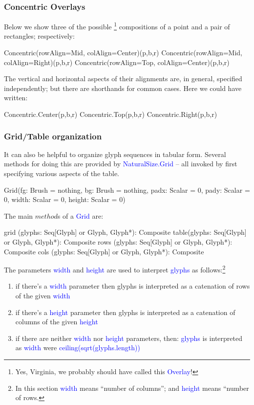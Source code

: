 \documentclass[12pt,a4paper]{article}
\def\Scala#1{\textcolor{blue}{\textsf{#1}}}
\def\SSS#1{\subsubsection*{#1}}
\begin{document}
\SSS{Concentric Overlays}
Below we show three of the possible \footnote{Yes,
Virginia, we probably should have called this \Scala{Overlay}!} 
compositions of a point and a pair of rectangles; respectively:
\begin{scala}
        Concentric(rowAlign=Mid, colAlign=Center)(p,b,r)
        Concentric(rowAlign=Mid, colAlign=Right)(p,b,r)
        Concentric(rowAlign=Top, colAlign=Center)(p,b,r)      
\end{scala}

\begin{center}
\quad\quad
{}
\quad\quad
{} 
\end{center}


The vertical and horizontal aspects of their alignments are, in general,
specified independently; but there are shorthands for common cases. Here
we could have written:

\begin{scala}
        Concentric.Center(p,b,r)
        Concentric.Top(p,b,r)
        Concentric.Right(p,b,r)      
\end{scala}

\clearpage
\SSS{Grid/Table organization}

It can also be helpful to organize glyph sequences in tabular form.
Several methods for doing this are provided by \Scala{NaturalSize.Grid}
-- all invoked by first specifying various aspects of the table.
\begin{scala}
        Grid(fg:     Brush  = nothing,
             bg:     Brush  = nothing,
             padx:   Scalar = 0,
             pady:   Scalar = 0,
             width:  Scalar = 0,
             height: Scalar = 0)
\end{scala}

The main $method$s of a \Scala{Grid} are:
\begin{scala}
  grid (glyphs: Seq[Glyph] or Glyph, Glyph*): Composite
  table(glyphs: Seq[Glyph] or Glyph, Glyph*): Composite
  rows (glyphs: Seq[Glyph] or Glyph, Glyph*): Composite
  cols (glyphs: Seq[Glyph] or Glyph, Glyph*): Composite
\end{scala}

The parameters \Scala{width} and \Scala{height}  are used to interpret
\Scala{glyphs} as follows:\footnote{In this section
\Scala{width} means ``number of columns''; and \Scala{height} means
``number of rows.}
\begin{enumerate}
     \item  if there's a \Scala{width} parameter then glyphs is interpreted as a catenation of rows of the given \Scala{width}
     \item  if there's a \Scala{height} parameter then glyphs is interpreted as a catenation of columns of the given \Scala{height}
     \item  if there are neither \Scala{width} nor \Scala{height} parameters, then:
            \Scala{glyphs} is interpreted as \Scala{width} were \Scala{ceiling(sqrt(glyphs.length))}
\end{enumerate}
\end{document}
